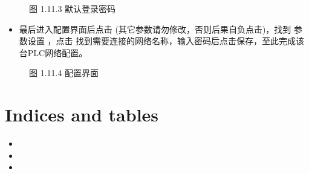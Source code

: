\documentclass[a4paper,10pt,english]{sphinxmanual}
\begin{document}
\begin{figure}[htbp]
\centering
\capstart

\noindent{}
\caption{图 1.11.3 默认登录密码}\label{\detokenize{operation_guide:id27}}\end{figure}
\begin{itemize}
\item {} 
\sphinxAtStartPar
最后进入配置界面后点击  (其它参数请勿修改，否则后果自负点击)，找到  参数设置 ，点击  找到需要连接的网络名称，输入密码后点击保存，至此完成该台PLC网络配置。

\end{itemize}

\begin{figure}[htbp]
\centering
\capstart

\noindent{}
\caption{图 1.11.4 配置界面}\label{\detokenize{operation_guide:id28}}\end{figure}


\chapter{Indices and tables}
\label{\detokenize{index:indices-and-tables}}\begin{itemize}
\item {} 
\sphinxAtStartPar
{}

\item {} 
\sphinxAtStartPar
{}

\item {} 
\sphinxAtStartPar
{}

\end{itemize}



\renewcommand{\indexname}{索引}
\printindex
\end{document}
